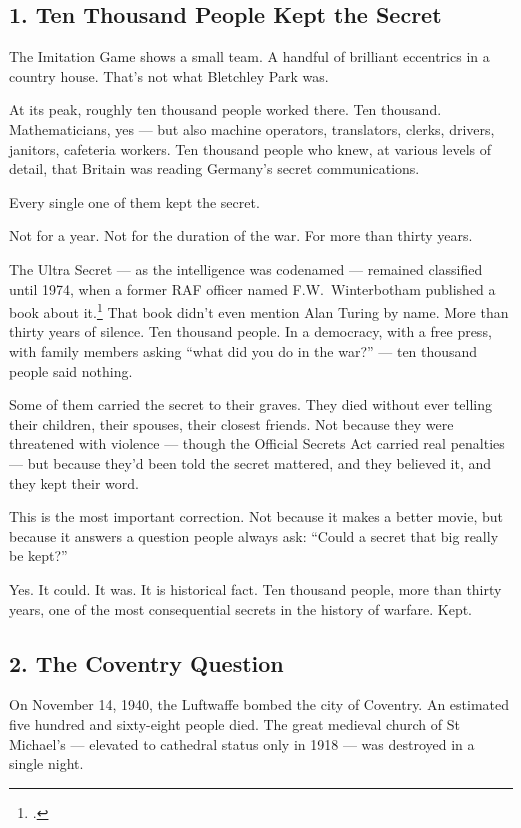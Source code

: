 \subsection*{1. Ten Thousand People Kept the Secret}
\label{spine:cw-ten-thousand-people-kept-the-secret}

The Imitation Game shows a small team. A handful of brilliant eccentrics in a country house. That's not what Bletchley Park was.

At its peak, roughly ten thousand people worked there. Ten thousand. Mathematicians, yes --- but also machine operators, translators, clerks, drivers, janitors, cafeteria workers. Ten thousand people who knew, at various levels of detail, that Britain was reading Germany's secret communications.

Every single one of them kept the secret.

Not for a year. Not for the duration of the war. For more than thirty years.

The Ultra Secret --- as the intelligence was codenamed --- remained classified until 1974, when a former RAF officer named F.W.\ Winterbotham published a book about it.\footcite{winterbotham1974} That book didn't even mention Alan Turing by name. More than thirty years of silence. Ten thousand people. In a democracy, with a free press, with family members asking ``what did you do in the war?'' --- ten thousand people said nothing.

Some of them carried the secret to their graves. They died without ever telling their children, their spouses, their closest friends. Not because they were threatened with violence --- though the Official Secrets Act carried real penalties --- but because they'd been told the secret mattered, and they believed it, and they kept their word.

This is the most important correction. Not because it makes a better movie, but because it answers a question people always ask: ``Could a secret that big really be kept?''

Yes. It could. It was. It is historical fact. Ten thousand people, more than thirty years, one of the most consequential secrets in the history of warfare. Kept.

\subsection*{2. The Coventry Question}
\label{spine:cw-the-coventry-question}

On November 14, 1940, the Luftwaffe bombed the city of Coventry. An estimated five hundred and sixty-eight people died. The great medieval church of St Michael's --- elevated to cathedral status only in 1918 --- was destroyed in a single night.

